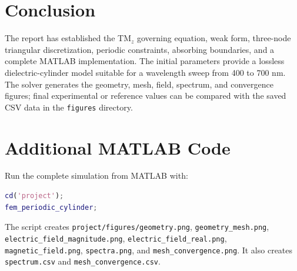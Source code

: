 \documentclass{article}
\begin{document}
\chapter{Conclusion}
The report has established the TM$_z$ governing equation, weak form,
three-node triangular discretization, periodic constraints, absorbing
boundaries, and a complete MATLAB implementation. The initial parameters
provide a lossless dielectric-cylinder model suitable for a wavelength
sweep from 400 to 700 nm. The solver generates the geometry, mesh, field,
spectrum, and convergence figures; final experimental or reference values
can be compared with the saved CSV data in the \texttt{figures} directory.

\appendix
\chapter{Additional MATLAB Code}
Run the complete simulation from MATLAB with:
\begin{lstlisting}[language=Matlab]
cd('project');
fem_periodic_cylinder;
\end{lstlisting}
The script creates \texttt{project/figures/geometry.png},
\texttt{geometry\_mesh.png}, \texttt{electric\_field\_magnitude.png},
\texttt{electric\_field\_real.png}, \texttt{magnetic\_field.png},
\texttt{spectra.png}, and \texttt{mesh\_convergence.png}. It also creates
\texttt{spectrum.csv} and \texttt{mesh\_convergence.csv}.
\end{document}
